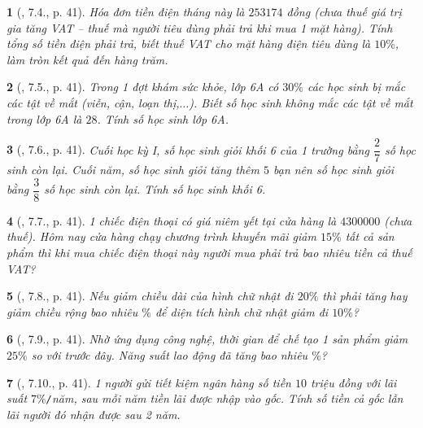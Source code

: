 \documentclass{article}
\newtheorem{baitoan}{}
\begin{document}
\begin{baitoan}[\cite{Binh_boi_duong_Toan_6_tap_2}, 7.4., p. 41]
	Hóa đơn tiền điện tháng này là $253174$ đồng (chưa thuế giá trị gia tăng VAT -- thuế mà người tiêu dùng phải trả khi mua 1 mặt hàng). Tính tổng số tiền điện phải trả, biết thuế VAT cho mặt hàng điện tiêu dùng là $10\%$, làm tròn kết quả đến hàng trăm.
\end{baitoan}

\begin{baitoan}[\cite{Binh_boi_duong_Toan_6_tap_2}, 7.5., p. 41]
	Trong 1 đợt khám sức khỏe, lớp 6A có $30\%$ các học sinh bị mắc các tật về mắt (viễn, cận, loạn thị,$\ldots$). Biết số học sinh không mắc các tật về mắt trong lớp 6A là $28$. Tính số học sinh lớp 6A.
\end{baitoan}

\begin{baitoan}[\cite{Binh_boi_duong_Toan_6_tap_2}, 7.6., p. 41]
	Cuối học kỳ I, số học sinh giỏi khối 6 của 1 trường bằng $\dfrac{2}{7}$ số học sinh còn lại. Cuối năm, số học sinh giỏi tăng thêm $5$ bạn nên số học sinh giỏi bằng $\dfrac{3}{8}$ số học sinh còn lại. Tính số học sinh khối 6.
\end{baitoan}

\begin{baitoan}[\cite{Binh_boi_duong_Toan_6_tap_2}, 7.7., p. 41]
	1 chiếc điện thoại có giá niêm yết tại cửa hàng là $4300000$ (chưa thuế). Hôm nay cửa hàng chạy chương trình khuyến mãi giảm $15\%$ tất cả sản phẩm thì khi mua chiếc điện thoại này người mua phải trả bao nhiêu tiền cả thuế VAT?
\end{baitoan}

\begin{baitoan}[\cite{Binh_boi_duong_Toan_6_tap_2}, 7.8., p. 41]
	Nếu giảm chiều dài của hình chữ nhật đi $20\%$ thì phải tăng hay giảm chiều rộng bao nhiêu $\%$ để diện tích hình chữ nhật giảm đi $10\%$?
\end{baitoan}

\begin{baitoan}[\cite{Binh_boi_duong_Toan_6_tap_2}, 7.9., p. 41]
	Nhờ ứng dụng công nghệ, thời gian để chế tạo 1 sản phẩm giảm $25\%$ so với trước đây. Năng suất lao động đã tăng bao nhiêu $\%$?
\end{baitoan}

\begin{baitoan}[\cite{Binh_boi_duong_Toan_6_tap_2}, 7.10., p. 41]
	1 người gửi tiết kiệm ngân hàng số tiền $10$ triệu đồng với lãi suất $7\%${\tt/}năm, sau mỗi năm tiền lãi được nhập vào gốc. Tính số tiền cả gốc lẫn lãi người đó nhận được sau 2 năm.
\end{baitoan}
\end{document}
